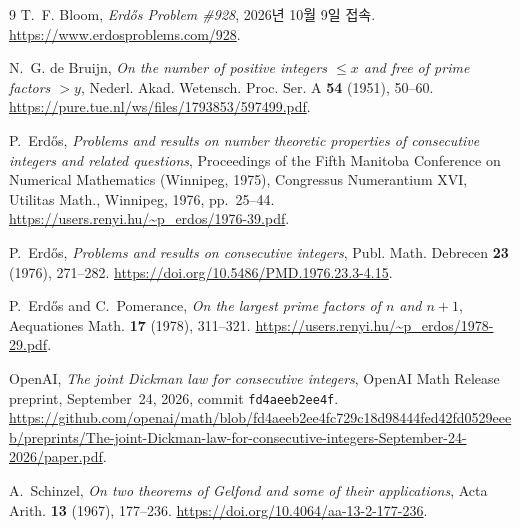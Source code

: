 \documentclass[11pt,a4paper]{amsart}
\theoremstyle{korplain}
\begin{document}
\begin{thebibliography}{9}
T.~F. Bloom, \emph{Erd\H{o}s Problem \#928},
2026년 10월 9일 접속.
\newline\url{https://www.erdosproblems.com/928}.

N.~G. de Bruijn, \emph{On the number of positive integers $\le x$ and
free of prime factors $>y$}, Nederl. Akad. Wetensch. Proc. Ser. A
\textbf{54} (1951), 50--60.
\newline\url{https://pure.tue.nl/ws/files/1793853/597499.pdf}.

P.~Erd\H{o}s, \emph{Problems and results on number theoretic properties of
consecutive integers and related questions}, Proceedings of the Fifth
Manitoba Conference on Numerical Mathematics (Winnipeg, 1975), Congressus
Numerantium XVI, Utilitas Math., Winnipeg, 1976, pp.~25--44.
\newline\url{https://users.renyi.hu/~p_erdos/1976-39.pdf}.

P.~Erd\H{o}s, \emph{Problems and results on consecutive integers}, Publ.
Math. Debrecen \textbf{23} (1976), 271--282.
\newline\url{https://doi.org/10.5486/PMD.1976.23.3-4.15}.

P.~Erd\H{o}s and C.~Pomerance, \emph{On the largest prime factors of $n$
and $n+1$}, Aequationes Math. \textbf{17} (1978), 311--321.
\newline\url{https://users.renyi.hu/~p_erdos/1978-29.pdf}.

OpenAI, \emph{The joint Dickman law for consecutive integers}, OpenAI
Math Release preprint, September~24, 2026, commit
\texttt{fd4aeeb2ee4f}.
\newline\url{https://github.com/openai/math/blob/fd4aeeb2ee4fc729c18d98444fed42fd0529eeeb/preprints/The-joint-Dickman-law-for-consecutive-integers-September-24-2026/paper.pdf}.

A.~Schinzel, \emph{On two theorems of Gelfond and some of their
applications}, Acta Arith. \textbf{13} (1967), 177--236.
\newline\url{https://doi.org/10.4064/aa-13-2-177-236}.
\end{thebibliography}
\end{document}
